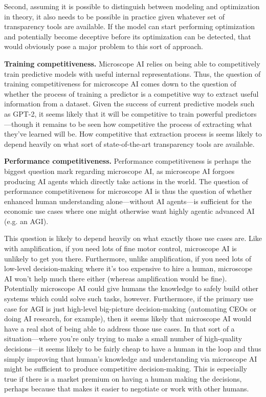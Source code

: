 \documentclass[
  onecolumn,
  natbib,
]{miri-tech-article}
\begin{document}
Second, assuming it is possible to distinguish between modeling and optimization in theory, it also needs to be possible in practice given whatever set of transparency tools are available. If the model can start performing optimization and potentially become deceptive before its optimization can be detected, that would obviously pose a major problem to this sort of approach.

\textbf{Training competitiveness.} Microscope AI relies on being able to competitively train predictive models with useful internal representations. Thus, the question of training competitiveness for microscope AI comes down to the question of whether the process of training a predictor is a competitive way to extract useful information from a dataset. Given the success of current predictive models such as GPT-2\cite{TODO: cite https://openai.com/blog/better-language-models}, it seems likely that it will be competitive to train powerful predictors---though it remains to be seen how competitive the process of extracting what they've learned will be. How competitive that extraction process is seems likely to depend heavily on what sort of state-of-the-art transparency tools are available.

\textbf{Performance competitiveness.} Performance competitiveness is perhaps the biggest question mark regarding microscope AI, as microscope AI forgoes producing AI agents which directly take actions in the world. The question of performance competitiveness for microscope AI is thus the question of whether enhanced human understanding alone---without AI agents---is sufficient for the economic use cases where one might otherwise want highly agentic advanced AI (e.g. an AGI).

This question is likely to depend heavily on what exactly those use cases are. Like with amplification, if you need lots of fine motor control, microscope AI is unlikely to get you there. Furthermore, unlike amplification, if you need lots of low-level decision-making where it's too expensive to hire a human, microscope AI won't help much there either (whereas amplification would be fine). Potentially microscope AI could give humans the knowledge to safely build other systems which could solve such tasks, however. Furthermore, if the primary use case for AGI is just high-level big-picture decision-making (automating CEOs or doing AI research, for example), then it seems likely that microscope AI would have a real shot of being able to address those use cases. In that sort of a situation---where you're only trying to make a small number of high-quality decisions---it seems likely to be fairly cheap to have a human in the loop and thus simply improving that human's knowledge and understanding via microscope AI might be sufficient to produce competitive decision-making. This is especially true if there is a market premium on having a human making the decisions, perhaps because that makes it easier to negotiate or work with other humans.
\end{document}
